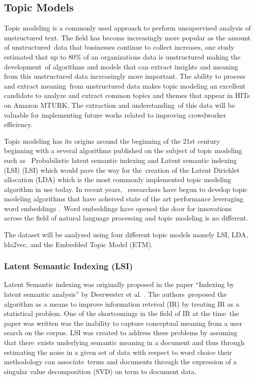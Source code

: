 \documentclass[letterpaper,12pt]{article}
\begin{document}
\subsection{Topic Models}
Topic modeling is a commonly used approach to perform unsupervised analysis of unstructured text. The field has become increasingly more popular as the amount of unstructured\
data that businesses continue to collect increases, one study estimated that up to 80\% of an organizations data is unstructured \cite{Sint2009CombiningUF} making the development\
of algorithms and models that can extract insights and meaning from this unstructured data increasingly more important. The ability to process and extract meaning\
from unstructured data makes topic modeling an excellent candidate to analyze and extract common topics and themes that appear in HITs on Amazon MTURK. The extraction and understanding\
of this data will be valuable for implementing future works related to improving crowdworker efficiency.

Topic modeling has its origins around the beginning of the 21st century beginning with a several algorithms published on the subject of topic modeling such as \
Probabilistic latent semantic indexing \cite{hofmann1999probabilistic} and Latent semantic indexing (LSI) \cite{papadimitriou2000latent} (LSI) which would pave the way for the\
creation of the Latent Dirichlet allocation (LDA) \cite{blei2003latent} which is the most commonly implemented topic modeling algorithm in use today. In recent years, \
researchers have begun to develop topic modeling algorithms that have acheived state of the art performance leveraging word embeddings \cite{mikolov2013distributed} \cite{dieng2019topic}.\
Word embeddings have opened the door for innovations across the field of natural language processing and topic modeling is no different. 

The dataset will be analyzed using four different topic models namely LSI, LDA, lda2vec, and the Embedded Topic Model (ETM). 
\subsubsection{Latent Semantic Indexing (LSI)}
Latent Semantic indexing was originally proposed in the paper ``Indexing by latent semantic analysis'' by Deerwester et al. \cite{deerwester1990indexing}. The authors\
proposed the algorithm as a means to improve information reteival (IR) by treating IR as a statistical problem. One of the shortcomings in the field of IR at the time\
the paper was written was the inability to capture conceptual meaning from a user search on the corpus. LSI was created to address these problems by assuming that there\
exists underlying semantic meaning in a document and thus through estimating the noise in a given set of data with respect to word choice their methodology can associate\
terms and documents through the expression of a singular value decomposition (SVD) on term to document data.
\end{document}
